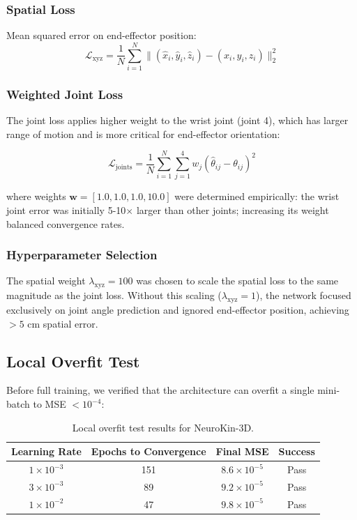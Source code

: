 \documentclass[12pt,a4paper,oneside]{report}
\begin{document}
\subsubsection{Spatial Loss}

Mean squared error on end-effector position:
\begin{equation}
\mathcal{L}_{\text{xyz}} = \frac{1}{N} \sum_{i=1}^{N} \|(\hat{x}_i, \hat{y}_i, \hat{z}_i) - (x_i, y_i, z_i)\|_2^2
\end{equation}

\subsubsection{Weighted Joint Loss}

The joint loss applies higher weight to the wrist joint (joint 4), which has larger range of motion and is more critical for end-effector orientation:

\begin{equation}
\mathcal{L}_{\text{joints}} = \frac{1}{N} \sum_{i=1}^{N} \sum_{j=1}^{4} w_j (\hat{\theta}_{ij} - \theta_{ij})^2
\end{equation}

where weights $\mathbf{w} = [1.0, 1.0, 1.0, 10.0]$ were determined empirically: the wrist joint error was initially 5-10$\times$ larger than other joints; increasing its weight balanced convergence rates.

\subsubsection{Hyperparameter Selection}

The spatial weight $\lambda_{\text{xyz}} = 100$ was chosen to scale the spatial loss to the same magnitude as the joint loss. Without this scaling ($\lambda_{\text{xyz}} = 1$), the network focused exclusively on joint angle prediction and ignored end-effector position, achieving $>5$ cm spatial error.

\subsection{Local Overfit Test}

Before full training, we verified that the architecture can overfit a single mini-batch to MSE $< 10^{-4}$:

\begin{table}[H]
\centering
\caption{Local overfit test results for NeuroKin-3D.}
\label{tab:overfit_test}
\begin{tabular}{cccc}
\toprule
Learning Rate & Epochs to Convergence & Final MSE & Success \\
\midrule
$1 \times 10^{-3}$ & 151 & $8.6 \times 10^{-5}$ & Pass \\
$3 \times 10^{-3}$ & 89 & $9.2 \times 10^{-5}$ & Pass \\
$1 \times 10^{-2}$ & 47 & $9.8 \times 10^{-5}$ & Pass \\
\bottomrule
\end{tabular}
\end{table}
\end{document}
